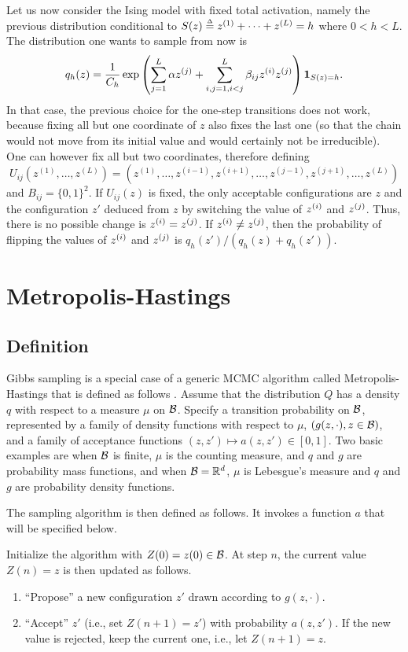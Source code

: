 Let us now consider the Ising model with fixed total activation, namely the previous distribution conditional to $S(z) \stackrel{{\scriptscriptstyle \Delta}}{=} z^{(1)} + \cdots + z^{(L)} = h$ where $0  < h < L$.  The distribution one wants to sample from now is
\[
q_h(z) = \frac1{C_h} \exp\left( \sum_{j=1}^L \alpha z^{(j)} + \sum_{i,j=1, i< j}^L \beta_{ij} z^{(i)} z^{(j)}\right) {\bm 1}_{S(z) = h}.
\]
In that case, the previous choice for the one-step transitions does not work, because fixing all but one coordinate of $z$ also fixes the last one (so that the chain would not move from its initial value and would certainly not be irreducible). One can however fix all but two coordinates, therefore defining
\[
U_{ij}(z^{(1)}, \ldots, z^{(L)}) =  (z^{(1)}, \ldots, z^{(i-1)}, z^{(i+1)}, \ldots, z^{(j-1)}, z^{(j+1)}, \ldots, z^{(L)})
\]
and $B_{ij} = \{0,1\}^2$. If $U_{ij}(z)$ is fixed, the only acceptable configurations are $z$ and the configuration $z'$ deduced from $z$ by switching the value of $z^{(i)}$ and $z^{(j)}$. Thus, there is no possible change is $z^{(i)} = z^{(j)}$. If $z^{(i)} \neq z^{(j)}$, then the probability of flipping the values of $z^{(i)}$ and $z^{(j)}$ is
$q_h(z') / (q_h(z) + q_h(z'))$.


\section{Metropolis-Hastings}

\subsection{Definition}
Gibbs sampling is a special case of a generic MCMC algorithm called Metropolis-Hastings that is defined as follows \citep{metropolis1953equation,hastings1970monte}. Assume that the distribution $Q$  has a density  $q$ with respect to a measure $\mu$ on  ${\mathcal B}$. Specify a  transition probability on ${\mathcal B}$, represented by a family of density functions with respect to $\mu$, $(g(z, \cdot), z\in {\mathcal B})$, and a family of acceptance functions $(z,z') \mapsto a(z,z') \in [0,1]$.
Two basic examples are when ${\mathcal B}$ is finite, $\mu$ is the counting measure, and $q$ and $g$ are probability mass functions, and when ${\mathcal B} = \mathbb R^d$, $\mu$ is  Lebesgue's measure and   $q$ and $g$ are probability density functions.

The sampling algorithm is then defined as follows. It invokes a function $a$ that will be specified below.
\begin{algorithm}
\label{alg:met.hast}
Initialize the algorithm with $Z(0) = z(0) \in {\mathcal B}$. At step $n$, the current value $Z(n) = z$ is then updated as follows.
\begin{enumerate}[label=$\bullet$]
\item ``Propose'' a new configuration $z'$ drawn according to $g(z, \cdot)$.
\item ``Accept'' $z'$ (i.e., set $Z(n+1)=z'$) with probability $a(z,z')$. If the new value is rejected, keep the current one, i.e., let $Z(n+1)=z$.
\end{enumerate}
\end{algorithm}

